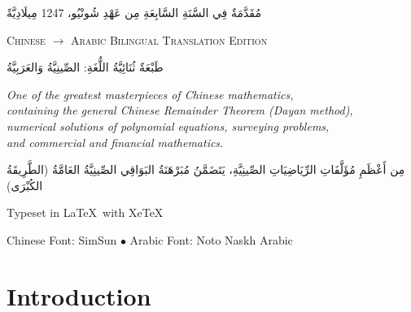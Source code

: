 \documentclass[11pt,a4paper]{article}
\newcommand{\ar}[1]{\arabicfont\beginR #1\endR}
\begin{document}
\begin{titlepage}
\begin{center}
\vspace{0.2cm}

{\footnotesize\ar{مُقَدَّمَةٌ فِي السَّنَةِ السَّابِعَةِ مِن عَهْدِ شُونْيُو، 1247 مِيلَادِيَّةً}}

\vspace{1.5cm}

{\small\textsc{Chinese $\rightarrow$ Arabic Bilingual Translation Edition}}

\vspace{0.3cm}

{\footnotesize\ar{طَبْعَةٌ ثُنَائِيَّةُ اللُّغَةِ: الصِّينِيَّةُ وَالعَرَبِيَّةُ}}

\vfill

{\footnotesize
\textit{One of the greatest masterpieces of Chinese mathematics,}\\
\textit{containing the general Chinese Remainder Theorem (Dayan method),}\\
\textit{numerical solutions of polynomial equations, surveying problems,}\\
\textit{and commercial and financial mathematics.}}

\vspace{0.3cm}

{\footnotesize\ar{مِن أَعْظَمِ مُؤَلَّفَاتِ الرِّيَاضِيَاتِ الصِّينِيَّةِ، يَتَضَمَّنُ مُبَرْهَنَةُ البَوَاقِي الصِّينِيَّةُ العَامَّةُ (الطَّرِيقَةُ الكُبْرَى)}}

\vspace{0.5cm}

{\small Typeset in \LaTeX\ with XeTeX}

\vspace{0.2cm}

{\footnotesize Chinese Font: SimSun $\bullet$ Arabic Font: Noto Naskh Arabic}

\end{center}
\end{titlepage}

\tableofcontents
\newpage

\section{Introduction}
\end{document}
